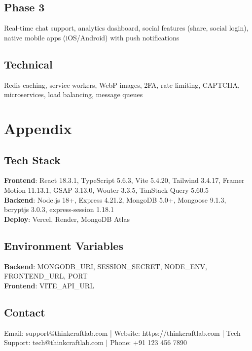 \documentclass[10pt]{article}
\begin{document}
\subsection{Phase 3}
Real-time chat support, analytics dashboard, social features (share, social login), native mobile apps (iOS/Android) with push notifications

\subsection{Technical}
Redis caching, service workers, WebP images, 2FA, rate limiting, CAPTCHA, microservices, load balancing, message queues

\section{Appendix}

\subsection{Tech Stack}
\textbf{Frontend}: React 18.3.1, TypeScript 5.6.3, Vite 5.4.20, Tailwind 3.4.17, Framer Motion 11.13.1, GSAP 3.13.0, Wouter 3.3.5, TanStack Query 5.60.5\\
\textbf{Backend}: Node.js 18+, Express 4.21.2, MongoDB 5.0+, Mongoose 9.1.3, bcryptjs 3.0.3, express-session 1.18.1\\
\textbf{Deploy}: Vercel, Render, MongoDB Atlas

\subsection{Environment Variables}
\textbf{Backend}: MONGODB\_URI, SESSION\_SECRET, NODE\_ENV, FRONTEND\_URL, PORT\\
\textbf{Frontend}: VITE\_API\_URL

\subsection{Contact}
Email: support@thinkcraftlab.com | Website: https://thinkcraftlab.com | Tech Support: tech@thinkcraftlab.com | Phone: +91 123 456 7890
\end{document}
